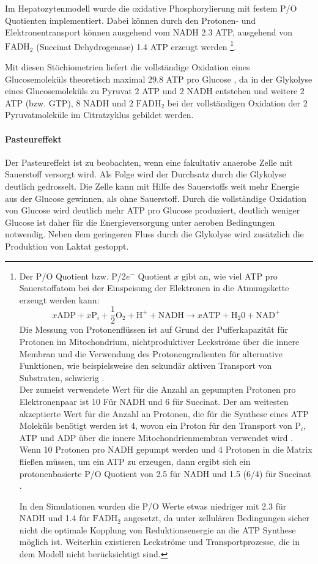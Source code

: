Im Hepatozytenmodell wurde die oxidative Phosphorylierung mit festem P/O Quotienten implementiert. Dabei können durch den Protonen- und Elektronentransport können ausgehend vom NADH 2.3 ATP, ausgehend von $\text{FADH}_2$ (Succinat Dehydrogenase) 1.4 ATP erzeugt werden
\footnote{
Der P/O Quotient bzw. P/2$e^-$ Quotient $x$ gibt an, wie viel ATP pro Sauerstoffatom bei der Einspeisung der Elektronen in die Atmungskette erzeugt werden kann:
\begin{equation*}
 x \text{ADP} + x \text{P}_i + \frac{1}{2} \text{O}_2 + \text{H}^+ + \text{NADH} \rightarrow x \text{ATP} + \text{H}_2\text{0} + \text{NAD}^+
\end{equation*}
Die Messung von Protonenflüssen ist auf Grund der Pufferkapazität für Protonen im Mitochondrium, nichtproduktiver Leckströme über die innere Membran und die Verwendung des Protonengradienten für alternative Funktionen, wie beispielsweise den sekundär aktiven Transport von Substraten, schwierig \cite{Nelson2008}.\\
Der zumeist verwendete Wert für die Anzahl an gepumpten Protonen pro Elektronenpaar ist 10 Für NADH und 6 für Succinat. Der am weitesten akzeptierte Wert für die Anzahl an Protonen, die für die Synthese eines ATP Moleküls benötigt werden ist 4, wovon ein Proton für den Transport von $\text{P}_i$, ATP und ADP über die innere Mitochondrienmembran verwendet wird \cite{Nelson2008}. Wenn 10 Protonen pro NADH gepumpt werden und 4 Protonen in die Matrix fließen müssen, um ein ATP zu erzeugen, dann ergibt sich ein protonenbasierte P/O Quotient von 2.5 für NADH und 1.5 (6/4) für Succinat \cite{Nelson2008}. 

In den Simulationen wurden die P/O Werte etwas niedriger mit 2.3 für NADH und 1.4 für $\text{FADH}_2$ angesetzt, da unter zellulären Bedingungen sicher nicht die optimale Kopplung von Reduktionsenergie an die ATP Synthese möglich ist. Weiterhin existieren Leckströme und Transportprozesse, die in dem Modell nicht berücksichtigt sind.}.

Mit diesen Stöchiometrien liefert die vollständige Oxidation eines Glucosemoleküls theoretisch maximal 29.8 ATP pro Glucose \cite{Nelson2008}, da in der Glykolyse eines Glucosemoleküls zu Pyruvat 2 ATP und 2 NADH entstehen und weitere 2 ATP (bzw. GTP), 8 NADH und 2 $\text{FADH}_2$ bei der vollständigen Oxidation der 2 Pyruvatmoleküle im Citratzyklus gebildet werden.

\paragraph{Pasteureffekt}
Der Pasteureffekt ist zu beobachten, wenn eine fakultativ anaerobe Zelle mit Sauerstoff versorgt wird. Als Folge wird der Durchsatz durch die Glykolyse deutlich gedrosselt. Die Zelle kann mit Hilfe des Sauerstoffs weit mehr Energie aus der Glucose gewinnen, als ohne Sauerstoff. Durch die vollständige Oxidation von Glucose wird deutlich mehr ATP pro Glucose produziert, deutlich weniger Glucose ist daher für die Energieversorgung unter aeroben Bedingungen notwendig. Neben dem geringeren Fluss durch die Glykolyse wird zusätzlich die Produktion von Laktat gestoppt.

